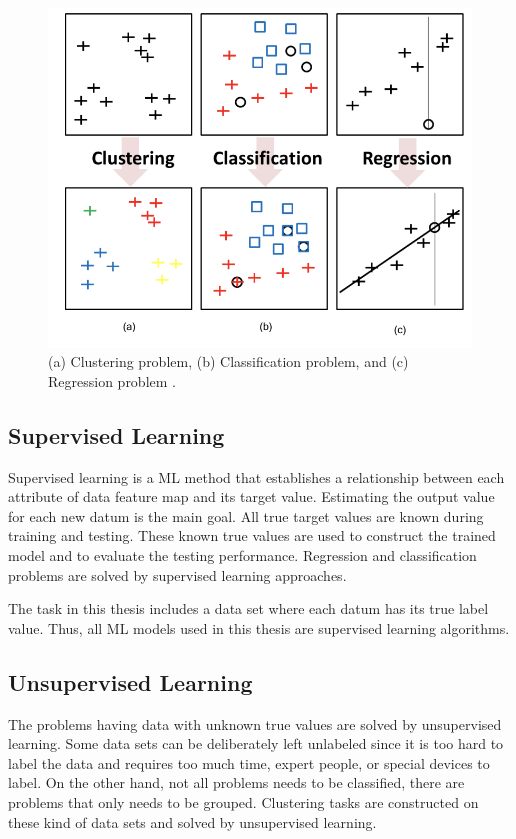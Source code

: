 \begin{figure}[h]
	\centering
	\includegraphics[width=.8\linewidth]{fig/clustering_classification_regression.png}
	\caption{(a) Clustering problem, (b) Classification problem, and (c) Regression problem \cite{parallel_linear_algebra}.}
	\label{clustering_classification_regression}
\end{figure}

\subsection{Supervised Learning}

Supervised learning is a ML method that establishes a relationship between each attribute of data feature map and its target value. Estimating the output value for each new datum is the main goal. All true target values are known during training and testing. These known true values are used to construct the trained model and to evaluate the testing performance. Regression and classification problems are solved by supervised learning approaches.

The task in this thesis includes a data set where each datum has its true label value. Thus, all ML models used in this thesis are supervised learning algorithms.

\subsection{Unsupervised Learning}

The problems having data with unknown true values are solved by unsupervised learning. Some data sets can be deliberately left unlabeled since it is too hard to label the data and requires too much time, expert people, or special devices to label. On the other hand, not all problems needs to be classified, there are problems that only needs to be grouped. Clustering tasks are constructed on these kind of data sets and solved by unsupervised learning.

